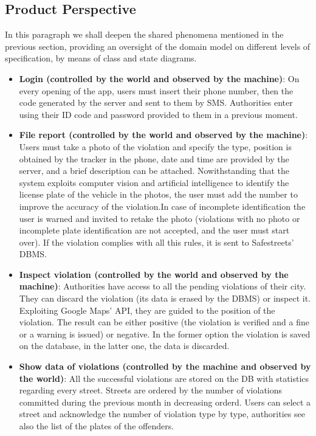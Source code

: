 \subsection {Product Perspective}

In this paragraph we shall deepen the shared phenomena mentioned in the previous section, providing an oversight of the domain model on different levels of specification, by means of class and state diagrams.

\begin{itemize}

\item \textbf{Login (controlled by the world and observed by the machine)}: On every opening of the app, users must insert their phone number, then the code generated by the server and sent to them by SMS. Authorities enter using their ID code and password provided to them in a previous moment.

\item \textbf{File report (controlled by the world and observed by the machine)}: Users must take a photo of the violation and specify the type, position is obtained by the tracker in the phone, date and time are provided by the server, and a brief description can be attached. Nowithstanding that the system exploits computer vision and artificial intelligence to identify the license plate of the vehicle in the photos, the user must add the number to improve the accuracy of the violation.In case of incomplete identification the user is warned and invited to retake the photo (violations with no photo or incomplete plate identification are not accepted, and the user must start over). If the violation complies with all this rules, it is sent to Safestreets' DBMS.

\item \textbf{Inspect violation (controlled by the world and observed by the machine)}: Authorities have access to all the pending violations of their city. They can discard the violation (its data is erased by the DBMS) or inspect it. Exploiting Google Maps' API, they are guided to the position of the violation. The result can be either positive (the violation is verified and a fine or a warning is issued) or negative. In the former option the violation is saved on the database, in the latter one, the data is discarded.

\item \textbf{Show data of violations (controlled by the machine and observed by the world)}: All the successful violations are stored on the DB with statistics regarding every street. Streets are ordered by the number of violations committed during the previous month in decreasing orderd. Users can select a street and acknowledge the number of violation type by type, authorities see also the list of the plates of the offenders.


\end{itemize}
